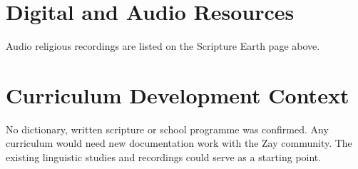 \documentclass[12pt]{article}
\begin{document}
\section{Digital and Audio Resources}
Audio religious recordings are listed on the Scripture Earth page above.

\section{Curriculum Development Context}
No dictionary, written scripture or school programme was confirmed. Any curriculum would need new documentation work with the Zay community. The existing linguistic studies and recordings could serve as a starting point.
\end{document}
